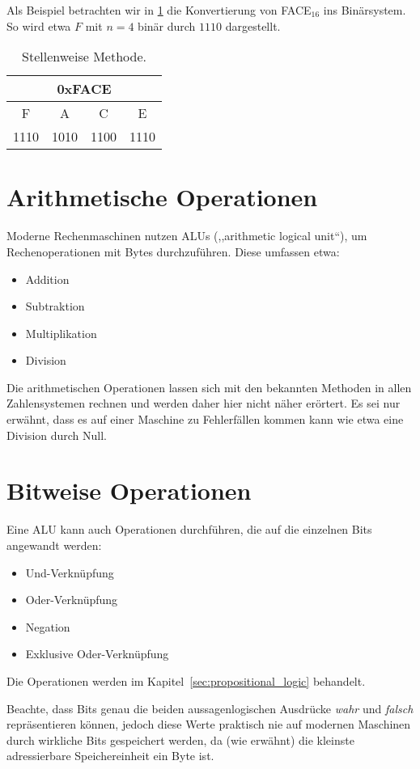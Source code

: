 Als Beispiel betrachten wir in \ref{tab:positional_approach} die
Konvertierung von FACE$_{16}$ ins Binärsystem. So wird etwa $F$
mit $n=4$ binär durch $1110$ dargestellt.
%
\begin{table}[ht]
  \begin{center}
    \begin{tabular}{cccc}
     \hline
      \multicolumn{4}{c}{0xFACE} \\
     \hline
      F & A & C & E \\
     \hline
      1110 & 1010 & 1100 & 1110 \\
     \hline
    \end{tabular}
    \caption{Stellenweise Methode.}
    \label{tab:positional_approach}
  \end{center}
\end{table}

\section{Arithmetische Operationen}
%
Moderne Rechenmaschinen nutzen ALUs (,,arithmetic logical unit``),
um Rechenoperationen mit Bytes durchzuführen. Diese umfassen etwa:
%
\begin{itemize}
 \item Addition
 \item Subtraktion
 \item Multiplikation
 \item Division
\end{itemize}

Die arithmetischen Operationen lassen sich mit den bekannten
Methoden in allen Zahlensystemen rechnen und werden daher hier
nicht näher erörtert. Es sei nur erwähnt, dass es auf einer
Maschine zu Fehlerfällen kommen kann wie etwa eine Division
durch Null.

\section{Bitweise Operationen}
%
Eine ALU kann auch Operationen durchführen, die auf die einzelnen Bits
angewandt werden:
%
\begin{itemize}
 \item Und-Verknüpfung
 \item Oder-Verknüpfung
 \item Negation
 \item Exklusive Oder-Verknüpfung
\end{itemize}
%
Die Operationen werden im Kapitel~\ref{sec:propositional_logic}
behandelt.

Beachte, dass Bits genau die beiden aussagenlogischen Ausdrücke
\textsl{wahr} und \textsl{falsch} repräsentieren können, jedoch diese
Werte praktisch nie auf modernen Maschinen durch wirkliche Bits
gespeichert werden, da (wie erwähnt) die kleinste adressierbare
Speichereinheit ein Byte ist.
